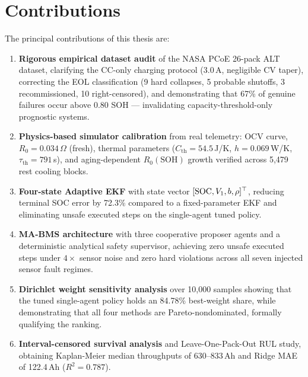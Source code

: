 \section{Contributions}

The principal contributions of this thesis are:

\begin{enumerate}
  \item \textbf{Rigorous empirical dataset audit} of the NASA PCoE
  26-pack ALT dataset, clarifying the CC-only charging protocol
  (3.0\,A, negligible CV taper), correcting the EOL classification
  (9 hard collapses, 5 probable shutoffs, 3 recommissioned, 10
  right-censored), and demonstrating that 67\% of genuine failures
  occur above 0.80 SOH --- invalidating capacity-threshold-only
  prognostic systems.

  \item \textbf{Physics-based simulator calibration} from real
  telemetry: OCV curve, $R_0 = 0.034\,\Omega$ (fresh), thermal
  parameters ($C_\mathrm{th} = 54.5$\,J/K, $h = 0.069$\,W/K,
  $\tau_\mathrm{th} = 791$\,s), and aging-dependent
  $R_0(\mathrm{SOH})$ growth verified across 5{,}479 rest cooling
  blocks.

  \item \textbf{Four-state Adaptive EKF} with state vector
  $[{\rm SOC}, V_1, b, \rho]^\top$, reducing terminal SOC error by
  72.3\% compared to a fixed-parameter EKF and eliminating unsafe
  executed steps on the single-agent tuned policy.

  \item \textbf{MA-BMS architecture} with three cooperative proposer
  agents and a deterministic analytical safety supervisor, achieving
  zero unsafe executed steps under $4\times$ sensor noise and zero
  hard violations across all seven injected sensor fault regimes.

  \item \textbf{Dirichlet weight sensitivity analysis} over
  10{,}000 samples showing that the tuned single-agent policy holds
  an 84.78\% best-weight share, while demonstrating that all four
  methods are Pareto-nondominated, formally qualifying the ranking.

  \item \textbf{Interval-censored survival analysis} and
  Leave-One-Pack-Out RUL study, obtaining Kaplan-Meier median
  throughputs of 630--833\,Ah and Ridge MAE of 122.4\,Ah
  ($R^2 = 0.787$).
\end{enumerate}

